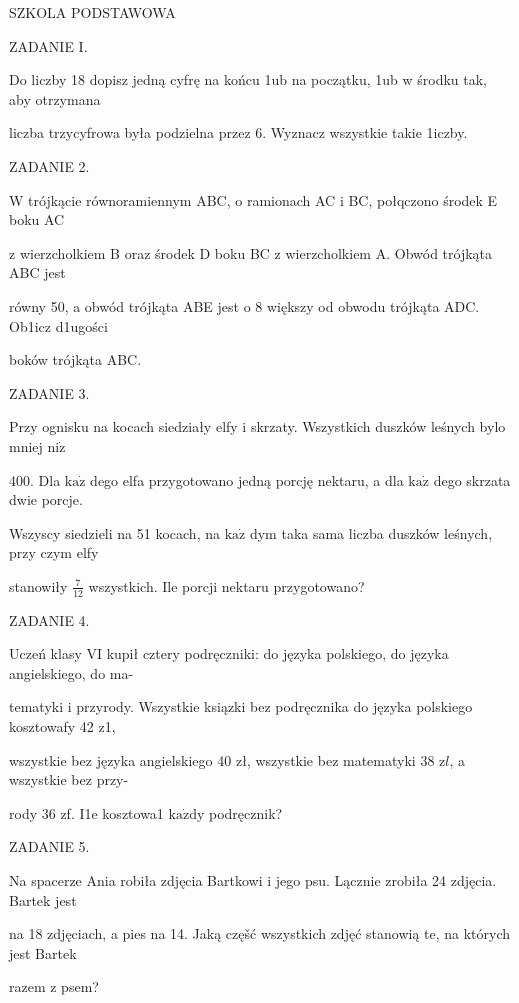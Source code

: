 \documentclass[a4paper,12pt]{article}
\begin{document}
SZKOLA PODSTAWOWA

ZADANIE I.

Do liczby 18 dopisz jedną cyfrę na końcu 1ub na początku, 1ub w środku tak, aby otrzymana

liczba trzycyfrowa była podzielna przez 6. Wyznacz wszystkie takie 1iczby.

ZADANIE 2.

W trójkącie równoramiennym ABC, o ramionach AC i BC, połqczono środek E boku AC

z wierzcholkiem B oraz środek D boku BC z wierzcholkiem A. Obwód trójkąta ABC jest

równy 50, a obwód trójkąta ABE jest o 8 większy od obwodu trójkąta ADC. Ob1icz d1ugości

boków trójkąta ABC.

ZADANIE 3.

Przy ognisku na kocach siedziały elfy i skrzaty. Wszystkich duszków leśnych bylo mniej $\mathrm{n}\mathrm{i}\dot{\mathrm{z}}$

400. Dla $\mathrm{k}\mathrm{a}\dot{\mathrm{z}}$ dego elfa przygotowano jedną porcję nektaru, a dla $\mathrm{k}\mathrm{a}\dot{\mathrm{z}}$ dego skrzata dwie porcje.

Wszyscy siedzieli na 51 kocach, na $\mathrm{k}\mathrm{a}\dot{\mathrm{z}}$ dym taka sama liczba duszków leśnych, przy czym elfy

stanowiły $\displaystyle \frac{7}{12}$ wszystkich. Ile porcji nektaru przygotowano?

ZADANIE 4.

Uczeń klasy VI kupił cztery podręczniki: do języka polskiego, do języka angielskiego, do ma-

tematyki i przyrody. Wszystkie ksiązki bez podręcznika do języka polskiego kosztowafy 42 z1,

wszystkie bez języka angielskiego 40 zł, wszystkie bez matematyki 38 $\mathrm{z}l$, a wszystkie bez przy-

rody 36 zf. I1e kosztowa1 $\mathrm{k}\mathrm{a}\dot{\mathrm{z}}\mathrm{d}\mathrm{y}$ podręcznik?

ZADANIE 5.

Na spacerze Ania robiła zdjęcia Bartkowi i jego psu. Lącznie zrobiła 24 zdjęcia. Bartek jest

na 18 zdjęciach, a pies na 14. Jaką częšć wszystkich zdjęć stanowią te, na których jest Bartek

razem z psem?
\end{document}

